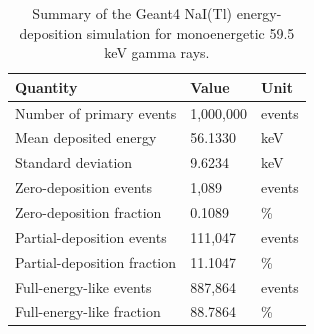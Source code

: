 \begin{table}[htbp]
\centering
\caption{Summary of the Geant4 NaI(Tl) energy-deposition simulation for monoenergetic 59.5 keV gamma rays.}
\label{tab:geant4_summary}
\begin{tabular}{lll}
\hline
Quantity & Value & Unit \\
\hline
Number of primary events & 1,000,000 & events \\
Mean deposited energy & 56.1330 & keV \\
Standard deviation & 9.6234 & keV \\
Zero-deposition events & 1,089 & events \\
Zero-deposition fraction & 0.1089 & \% \\
Partial-deposition events & 111,047 & events \\
Partial-deposition fraction & 11.1047 & \% \\
Full-energy-like events & 887,864 & events \\
Full-energy-like fraction & 88.7864 & \% \\
\hline
\end{tabular}
\end{table}